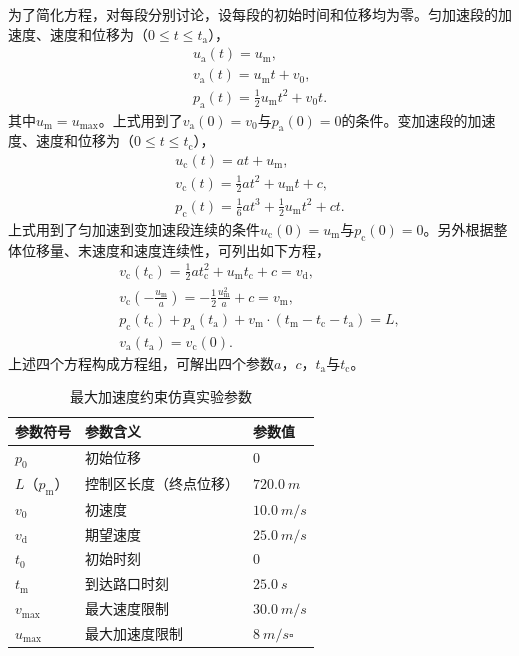 为了简化方程，对每段分别讨论，设每段的初始时间和位移均为零。匀加速段的加速度、速度和位移为（$0\leq t\leq t_\mathrm{a}$），
\begin{gather}
u_\mathrm{a}(t)=u_\mathrm{m},\label{eq:amax:ea1}\\
v_\mathrm{a}(t)=u_\mathrm{m}t+v_0,\\
p_\mathrm{a}(t)=\frac12u_\mathrm{m}t^2+v_0t.\label{eq:amax:ea3}
\end{gather}
其中$u_\mathrm{m}=u_{\max}$。上式用到了$v_\mathrm{a}(0)=v_0$与$p_\mathrm{a}(0)=0$的条件。变加速段的加速度、速度和位移为（$0\leq t\leq t_\mathrm{c}$），
\begin{gather}
u_\mathrm{c}(t)=at+u_\mathrm{m},\label{eq:amax:ca1}\\
v_\mathrm{c}(t)=\frac12at^2+u_\mathrm{m}t+c,\\
p_\mathrm{c}(t)=\frac16at^3+\frac12u_\mathrm{m}t^2+ct.\label{eq:amax:ca3}
\end{gather}
上式用到了匀加速到变加速段连续的条件$u_\mathrm{c}(0)=u_\mathrm{m}$与$p_\mathrm{c}(0)=0$。另外根据整体位移量、末速度和速度连续性，可列出如下方程，
\begin{gather}
v_\mathrm{c}(t_\mathrm{c})=\frac12at_\mathrm{c}^2+u_\mathrm{m}t_\mathrm{c}+c=v_\mathrm{d},\label{eq:amax:1}\\
v_\mathrm{c}(-\frac{u_\mathrm{m}}{a})=-\frac12\frac{u_\mathrm{m}^2}{a}+c=v_\mathrm{m},\label{eq:amax:2}\\
p_\mathrm{c}(t_\mathrm{c})+p_\mathrm{a}(t_\mathrm{a})+v_\mathrm{m}\cdot(t_\mathrm{m}-t_\mathrm{c}-t_\mathrm{a})=L,\\
v_\mathrm{a}(t_\mathrm{a})=v_\mathrm{c}(0).\label{eq:amax:4}
\end{gather}
上述四个方程构成方程组，可解出四个参数$a$，$c$，$t_\mathrm{a}$与$t_\mathrm{c}$。

\begin{table}[htbp]
\centering
\caption{最大加速度约束仿真实验参数}
\label{tab:amax:param}
\begin{tabular}{lll}
\toprule[1.5pt]
参数符号 & 参数含义 & 参数值 \\
\midrule[1pt]
$p_0$ & 初始位移 & $0$ \\
$L$（$p_\mathrm{m}$） & 控制区长度（终点位移） & $\SI{720.0}{m}$ \\
$v_0$ & 初速度 & $\SI{10.0}{m\per s}$ \\
$v_\mathrm{d}$ & 期望速度 & $\SI{25.0}{m\per s}$ \\
$t_0$ & 初始时刻 & $0$ \\
$t_\mathrm{m}$ & 到达路口时刻 & $\SI{25.0}{s}$ \\
$v_{\max}$ & 最大速度限制 & $\SI{30.0}{m\per s}$ \\
$u_{\max}$ & 最大加速度限制 & $\SI{8}{m\per s\square}$ \\
\bottomrule[1.5pt]
\end{tabular}
\end{table}

